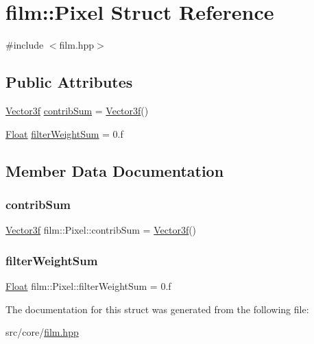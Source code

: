 \hypertarget{structfilm_1_1Pixel}{}\section{film\+::Pixel Struct Reference}
\label{structfilm_1_1Pixel}


{\ttfamily \#include $<$film.\+hpp$>$}

\subsection*{Public Attributes}
\begin{DoxyCompactItemize}
\item 
\mbox{\hyperlink{cyclop_8hpp_a5a0a2e85b081623ef3f7e7e8d43024f5}{Vector3f}} \mbox{\hyperlink{structfilm_1_1Pixel_a20d6e556edab676ab424963ea02c7c9d}{contrib\+Sum}} = \mbox{\hyperlink{cyclop_8hpp_a5a0a2e85b081623ef3f7e7e8d43024f5}{Vector3f}}()
\item 
\mbox{\hyperlink{cyclop_8hpp_a07afd7094cb489cbd514c76e6f55d34f}{Float}} \mbox{\hyperlink{structfilm_1_1Pixel_a10b9f87ead00163c703c3df8d4453bf2}{filter\+Weight\+Sum}} = 0.f
\end{DoxyCompactItemize}


\subsection{Member Data Documentation}
\mbox{\label{structfilm_1_1Pixel_a20d6e556edab676ab424963ea02c7c9d}} 
\subsubsection{\texorpdfstring{contribSum}{contribSum}}
{\footnotesize\ttfamily \mbox{\hyperlink{cyclop_8hpp_a5a0a2e85b081623ef3f7e7e8d43024f5}{Vector3f}} film\+::\+Pixel\+::contrib\+Sum = \mbox{\hyperlink{cyclop_8hpp_a5a0a2e85b081623ef3f7e7e8d43024f5}{Vector3f}}()}

\mbox{\label{structfilm_1_1Pixel_a10b9f87ead00163c703c3df8d4453bf2}} 
\subsubsection{\texorpdfstring{filterWeightSum}{filterWeightSum}}
{\footnotesize\ttfamily \mbox{\hyperlink{cyclop_8hpp_a07afd7094cb489cbd514c76e6f55d34f}{Float}} film\+::\+Pixel\+::filter\+Weight\+Sum = 0.f}



The documentation for this struct was generated from the following file\+:\begin{DoxyCompactItemize}
\item 
src/core/\mbox{\hyperlink{film_8hpp}{film.\+hpp}}\end{DoxyCompactItemize}
